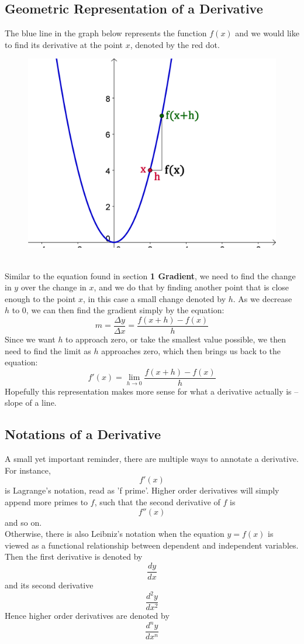 \documentclass[hidelinks, a4paper, 12pt]{article}
\newcommand{\bd}{\textbf}
\newcommand{\n}{\\[\baselineskip]}
\begin{document}
        \subsection{Geometric Representation of a Derivative}
            The blue line in the graph below represents the function $f(x)$ and we would like to find its derivative at the point $x$, denoted by the red dot.
            \begin{figure}[ht]
                \centering
                \includegraphics[scale=0.15]{derivative}
            \end{figure}\n
            Similar to the equation found in section \bd{1 Gradient}, we need to find the change in $y$ over the change in $x$, and we do that by finding another point that is close enough to
            the point $x$, in this case a small change denoted by $h$. As we decrease $h$ to $0$, we can then find the gradient simply by the equation:
            \[m = \frac{\Delta y}{\Delta x} = \frac{f(x+h)-f(x)}{h}\]
            Since we want $h$ to approach zero, or take the smallest value possible, we then need to find the limit as $h$ approaches zero, which then brings us back to the equation:
            \[f'(x) = \lim_{h\to0} \frac{f(x+h)-f(x)}{h}\]
            Hopefully this representation makes more sense for what a derivative actually is -- slope of a line.
        
        \subsection{Notations of a Derivative}
            A small yet important reminder, there are multiple ways to annotate a derivative. For instance,
            \[f'(x)\]
            is Lagrange's notation, read as 'f prime'. Higher order derivatives will simply append more primes to $f$, such that the second derivative of $f$ is
            \[f''(x)\]
            and so on.\n
            Otherwise, there is also Leibniz's notation when the equation $y = f(x)$ is viewed as a functional relationship between dependent and independent variables. 
            Then the first derivative is denoted by
            \[\frac{dy}{dx}\]
            and its second derivative
            \[\frac{d^2y}{dx^2}\]
            Hence higher order derivatives are denoted by
            \[\frac{d^ny}{dx^n}\]
\end{document}
